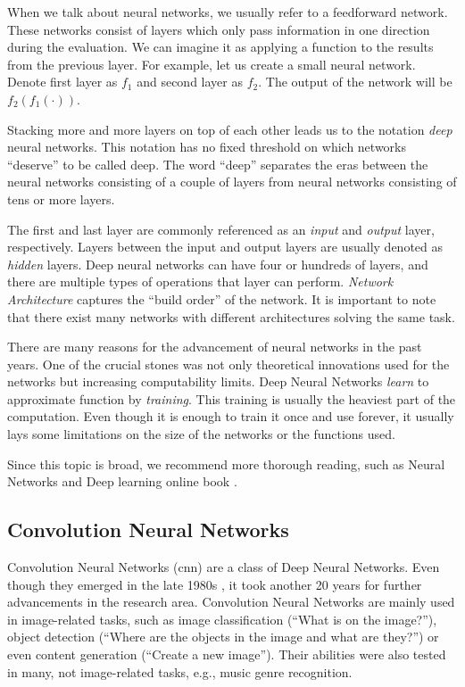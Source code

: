 When we talk about neural networks, we usually refer to a feedforward network. These networks consist of layers which only pass information in one direction during the evaluation. We can imagine it as applying a function to the results from the previous layer. For example, let us create a small neural network. Denote first layer as \(f_1\) and second layer as \(f_2\). The output of the network will be \(f_2\left(f_1\left(\cdot\right)\right)\).

Stacking more and more layers on top of each other leads us to the notation \emph{deep} neural networks. This notation has no fixed threshold on which networks ``deserve'' to be called deep. The word ``deep'' separates the eras between the neural networks consisting of a couple of layers from neural networks consisting of tens or more layers.  

The first and last layer are commonly referenced as an \emph{input} and \emph{output} layer, respectively. Layers between the input and output layers are usually denoted as \emph{hidden} layers. Deep neural networks can have four or hundreds of layers, and there are multiple types of operations that layer can perform. \emph{Network Architecture} captures the ``build order'' of the network. It is important to note that there exist many networks with different architectures solving the same task.

There are many reasons for the advancement of neural networks in the past years. One of the crucial stones was not only theoretical innovations used for the networks but increasing computability limits. Deep Neural Networks \emph{learn} to approximate function by \emph{training}. This training is usually the heaviest part of the computation. Even though it is enough to train it once and use forever, it usually lays some limitations on the size of the networks or the functions used.

Since this topic is broad, we recommend more thorough reading, such as Neural Networks and Deep learning online book \citep{nielsen2015neural}.

\subsection{Convolution Neural Networks}

Convolution Neural Networks (\acrshort{cnn}) are a class of Deep Neural Networks. Even though they emerged in the late 1980s \citep{lecun1989backpropagation}, it took another 20 years for further advancements in the research area. Convolution Neural Networks are mainly used in image-related tasks, such as image classification (``What is on the image?''), object detection (``Where are the objects in the image and what are they?'') or even content generation (``Create a new image''). Their abilities were also tested in many, not image-related tasks, e.g., music genre recognition.

